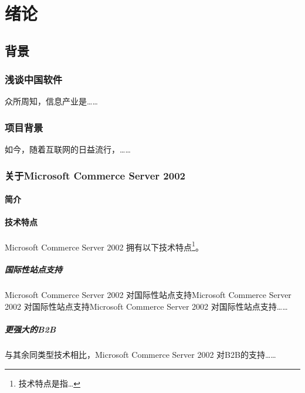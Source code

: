 \documentclass[printMode=false, declarePage=false]{ecnuthesis}
\begin{document}
\mainmatter

\chapter{绪论}

\section{背景}

\subsection{浅谈中国软件}

众所周知，信息产业是……

\subsection{项目背景}

如今，随着互联网的日益流行\cite{OOSTRUM01}，……

\subsection{关于Microsoft Commerce Server 2002}

\subsubsection{简介}

\subsubsection{技术特点}

Microsoft Commerce Server 2002 拥有以下技术特点\footnote{技术特点是指…}。

\paragraph{国际性站点支持}

Microsoft Commerce Server 2002 对国际性站点\cite{Bayes63:classical}支持Microsoft Commerce Server 2002 对国际性站点支持Microsoft Commerce Server 2002 对国际性站点支持……

\paragraph{更强大的B2B}

与其余同类型技术相比，Microsoft Commerce Server 2002 对B2B的支持……
\end{document}
